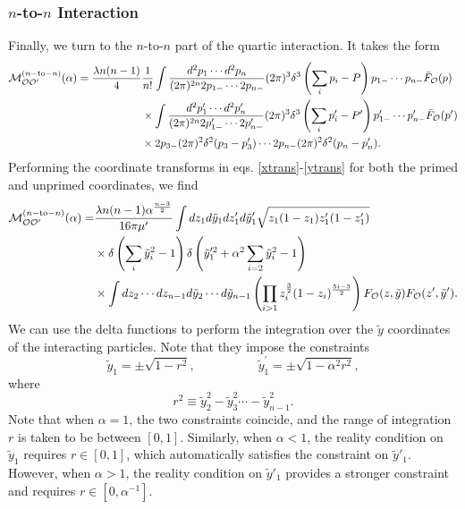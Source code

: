{\subsubsection{$n$-to-$n$ Interaction} Finally, we turn to the $n$-to-$n$ part of the quartic interaction. It takes the form \begin{equation}
	\begin{aligned}
		{\cal M}_{{\cal O} {\cal O}'}^{(n-\textrm{to}-n)}(\alpha) = \frac{\lambda n(n-1)}{4}& \frac{1}{n!} \int \frac{d^2p_1 \dotsb d^2 p_n}{(2\pi)^{2n} 2p_{1-} \dotsb 2p_{n-}} (2\pi)^3 \delta^3\left(\sum_i p_i - P \right) p_{1-} \dotsb p_{n-} \bar{F}_{{\cal O}}(p) \\
		&\times \int \frac{d^2 p'_1 \dotsb d^2 p'_n}{(2\pi)^{2n} 2p'_{1-} \dotsb 2p'_{n-}} (2\pi)^3 \delta^3\left(\sum_i p'_i - P' \right) p'_{1-} \dotsb p'_{n-} \bar{F}_{{\cal O}}(p') \\
		&\times 2p_{3-}(2\pi)^2 \delta^2(p_3 - p_3') \dotsb 2p_{n-} (2\pi)^2 \delta^2(p_n -p'_n).
	\end{aligned}
\end{equation} Performing the coordinate transforms in eqs. \eqref{xtrans}-\eqref{ytrans} for both the primed and unprimed coordinates, we find \begin{equation}
	\begin{aligned}
		{\cal M}_{{\cal O} {\cal O}'}^{(n-\textrm{to}-n)}(\alpha) =& \frac{\lambda n(n-1) \alpha^{\frac{n-3}{2}}}{16 \pi \mu'} \int dz_1  d\tilde{y}_1 dz'_1 d\tilde{y}'_1 \sqrt{z_1 (1-z_1) z'_1 (1-z'_1)} \\
		&\times \delta\left(\sum_i \tilde{y}_i^2 - 1 \right) \delta\left({\tilde{y}_1}^{\prime 2} +  \alpha^2 \sum_{i =2}\tilde{y}_i^2  -1\right) \\
		&\times \int dz_2 \dotsb dz_{n-1} d\tilde{y}_2 \dotsb d\tilde{y}_{n-1} \left( \prod_{i>1} z_i^{\frac{3}{2}} (1-z_i)^{\frac{5i-3}{2}} \right) F_{{\cal O}}(z,\tilde{y}) F_{{\cal O}}(z',\tilde{y}').
	\end{aligned}
\end{equation} We can use the delta functions to perform the integration over the $\tilde{y}$ coordinates of the interacting particles. Note that they impose the constraints \begin{equation}
	\tilde{y}_1 = \pm\sqrt{1-r^2}, \quad\quad\quad\quad\quad \tilde{y}_1^{\prime} = \pm \sqrt{ 1 - \alpha^2 r^2},
\end{equation} where \begin{equation}
	r^2 \equiv \tilde{y}_2^2 - \tilde{y}_3^2 \dotsb - \tilde{y}_{n-1}^2.
\end{equation} Note that when $\alpha =1$, the two constraints coincide, and the range of integration $r$ is taken to be between $[0,1]$. Similarly, when $\alpha < 1 $, the reality condition on $\tilde{y}_1$ requires $r \in [0,1]$, which automatically satisfies the constraint on $\tilde{y}'_1$. However, when $\alpha > 1$, the reality condition on $\tilde{y}'_1$ provides a stronger constraint and requires $r \in [0, \alpha^{-1} ]$.

}
